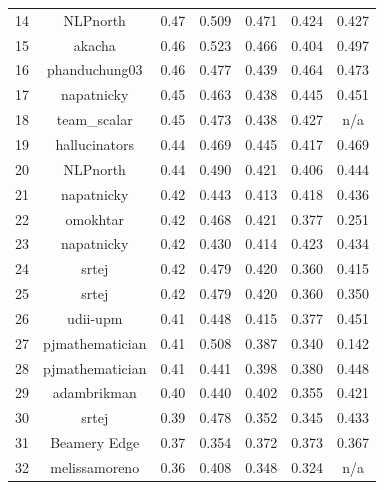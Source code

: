 \begin{xltabular}{\textwidth}{X cccccc}
    14 & NLPnorth           & 0.47              & 0.509      & 0.471      & 0.424      & 0.427      \\
    15 & akacha             & 0.46              & 0.523      & 0.466      & 0.404      & 0.497      \\
    16 & phanduchung03      & 0.46              & 0.477      & 0.439      & 0.464      & 0.473      \\
    17 & napatnicky         & 0.45              & 0.463      & 0.438      & 0.445      & 0.451      \\
    18 & team\_scalar       & 0.45              & 0.473      & 0.438      & 0.427      & n/a        \\
    19 & hallucinators      & 0.44              & 0.469      & 0.445      & 0.417      & 0.469      \\
    20 & NLPnorth           & 0.44              & 0.490      & 0.421      & 0.406      & 0.444      \\
    21 & napatnicky         & 0.42              & 0.443      & 0.413      & 0.418      & 0.436      \\
    22 & omokhtar           & 0.42              & 0.468      & 0.421      & 0.377      & 0.251      \\
    23 & napatnicky         & 0.42              & 0.430      & 0.414      & 0.423      & 0.434      \\
    24 & srtej              & 0.42              & 0.479      & 0.420      & 0.360      & 0.415      \\
    25 & srtej              & 0.42              & 0.479      & 0.420      & 0.360      & 0.350      \\
    26 & udii-upm           & 0.41              & 0.448      & 0.415      & 0.377      & 0.451      \\
    27 & pjmathematician    & 0.41              & 0.508      & 0.387      & 0.340      & 0.142      \\
    28 & pjmathematician    & 0.41              & 0.441      & 0.398      & 0.380      & 0.448      \\
    29 & adambrikman        & 0.40              & 0.440      & 0.402      & 0.355      & 0.421      \\
    30 & srtej              & 0.39              & 0.478      & 0.352      & 0.345      & 0.433      \\
    31 & Beamery Edge       & 0.37              & 0.354      & 0.372      & 0.373      & 0.367      \\
    32 & melissamoreno      & 0.36              & 0.408      & 0.348      & 0.324      & n/a        \\

\end{xltabular}
